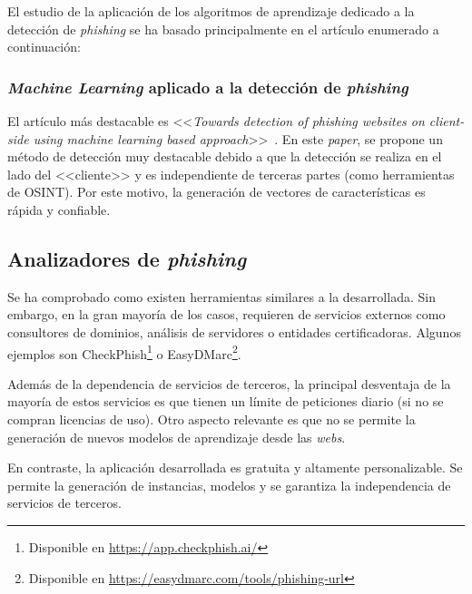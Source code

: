 El estudio de la aplicación de los algoritmos de aprendizaje dedicado a la detección de \textit{phishing} se ha basado principalmente en el artículo enumerado a continuación:

\subsubsection{\textit{Machine Learning} aplicado a la detección de \textit{phishing}}
El artículo más destacable es <<\textit{Towards detection of phishing websites on client-side using machine learning based approach}>>~\cite{featuresPhishing2018Gupta}. En este \textit{paper}, se propone un método de detección muy destacable debido a que la detección se realiza en el lado del <<cliente>> y es independiente de terceras partes (como herramientas de OSINT). Por este motivo, la generación de vectores de características es rápida y confiable.

\subsection{Analizadores de \textit{phishing}}

Se ha comprobado como existen herramientas similares a la desarrollada. Sin embargo, en la gran mayoría de los casos, requieren de servicios externos como consultores de dominios, análisis de servidores o entidades certificadoras. Algunos ejemplos son CheckPhish\footnote{Disponible en \url{https://app.checkphish.ai/}} o EasyDMarc\footnote{Disponible en \url{https://easydmarc.com/tools/phishing-url}}.

Además de la dependencia de servicios de terceros, la principal desventaja de la mayoría de estos servicios es que tienen un límite de peticiones diario (si no se compran licencias de uso). Otro aspecto relevante es que no se permite la generación de nuevos modelos de aprendizaje desde las \textit{webs}.

En contraste, la aplicación desarrollada es gratuita y altamente personalizable. Se permite la generación de instancias, modelos y se garantiza la independencia de servicios de terceros.
